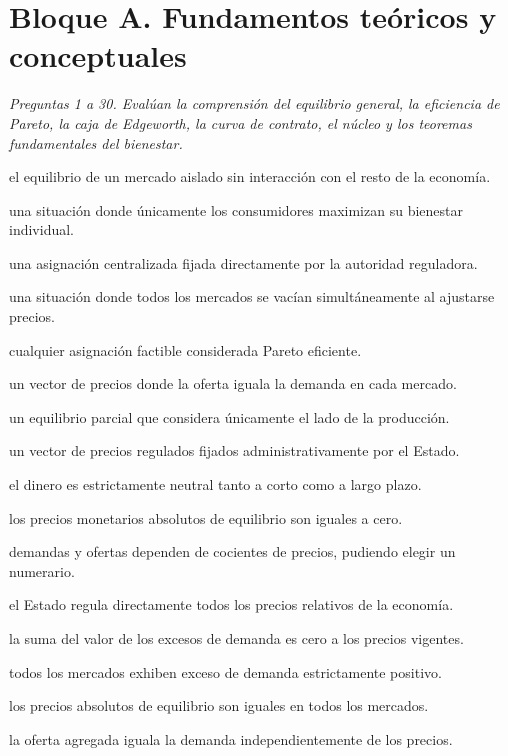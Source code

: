 \section*{Bloque A. Fundamentos teóricos y conceptuales}

\noindent\textit{Preguntas 1 a 30. Evalúan la comprensión del equilibrio general, la eficiencia de Pareto, la caja de Edgeworth, la curva de contrato, el núcleo y los teoremas fundamentales del bienestar.}

\begin{opts}
    \item el equilibrio de un mercado aislado sin interacción con el resto de la economía.
    \item una situación donde únicamente los consumidores maximizan su bienestar individual.
    \item una asignación centralizada fijada directamente por la autoridad reguladora.
    \item una situación donde todos los mercados se vacían simultáneamente al ajustarse precios.
\end{opts}

\begin{opts}
    \item cualquier asignación factible considerada Pareto eficiente.
    \item un vector de precios donde la oferta iguala la demanda en cada mercado.
    \item un equilibrio parcial que considera únicamente el lado de la producción.
    \item un vector de precios regulados fijados administrativamente por el Estado.
\end{opts}

\begin{opts}
    \item el dinero es estrictamente neutral tanto a corto como a largo plazo.
    \item los precios monetarios absolutos de equilibrio son iguales a cero.
    \item demandas y ofertas dependen de cocientes de precios, pudiendo elegir un numerario.
    \item el Estado regula directamente todos los precios relativos de la economía.
\end{opts}

\begin{opts}
    \item la suma del valor de los excesos de demanda es cero a los precios vigentes.
    \item todos los mercados exhiben exceso de demanda estrictamente positivo.
    \item los precios absolutos de equilibrio son iguales en todos los mercados.
    \item la oferta agregada iguala la demanda independientemente de los precios.
\end{opts}

